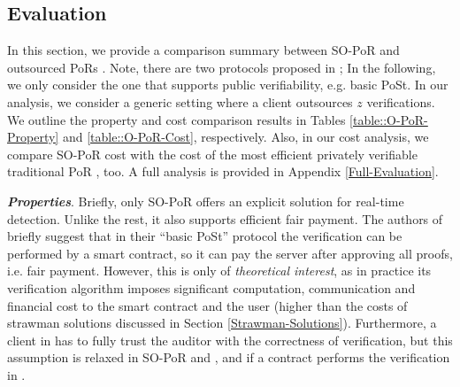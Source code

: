
\subsection{Evaluation}\label{full-Evaluation}

In this section, we provide a comparison summary between  SO-PoR and outsourced PoRs  \cite{armknecht2014outsourced,xu2016lightweight,Storage-Time}.   Note, there are two protocols  proposed in  \cite{Storage-Time}; In the following, we only consider the one that supports public verifiability, e.g. basic PoSt.  In our analysis, we consider a generic setting where a client outsources $z$ verifications. We outline the property and cost comparison results in Tables \ref{table::O-PoR-Property} and \ref{table::O-PoR-Cost}, respectively. Also, in our cost analysis, we compare SO-PoR cost with the cost of the most efficient privately verifiable traditional PoR \cite{DBLP:conf/asiacrypt/ShachamW08}, too. A full analysis is provided in Appendix \ref{Full-Evaluation}.







\noindent\textbf{\textit{Properties}}. Briefly, only SO-PoR offers an explicit solution for real-time detection. Unlike the rest, it also supports efficient fair payment. The authors of \cite{Storage-Time}  briefly suggest that in their  ``basic PoSt''  protocol the verification can be performed by a smart contract, so it can pay the server after approving all proofs, i.e. fair payment. However, this is  only of \emph{theoretical interest}, as in practice its verification algorithm imposes significant computation, communication and financial cost to the smart contract and the user (higher than the costs of strawman solutions discussed in Section \ref{Strawman-Solutions}). Furthermore,  a client in  \cite{xu2016lightweight} has to fully trust the auditor with the correctness of verification, but this assumption is relaxed in   SO-PoR and  \cite{armknecht2014outsourced}, and  if a contract performs the verification in \cite{Storage-Time}.  %



